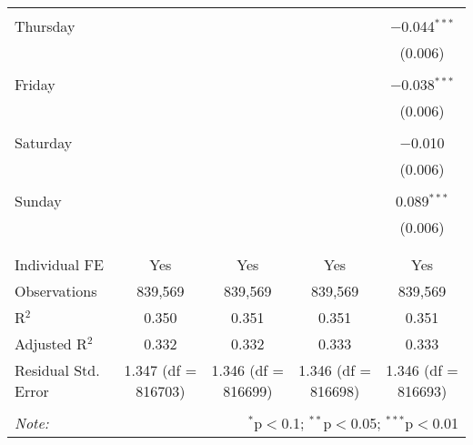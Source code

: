 \documentclass[
]{article}
\begin{document}
\begin{table}[!htbp]
{\begin{tabular}{@{\extracolsep{5pt}}lcccc}
  & & & & \\ 
 Thursday &  &  &  & $-$0.044$^{***}$ \\ 
  &  &  &  & (0.006) \\ 
  & & & & \\ 
 Friday &  &  &  & $-$0.038$^{***}$ \\ 
  &  &  &  & (0.006) \\ 
  & & & & \\ 
 Saturday &  &  &  & $-$0.010 \\ 
  &  &  &  & (0.006) \\ 
  & & & & \\ 
 Sunday &  &  &  & 0.089$^{***}$ \\ 
  &  &  &  & (0.006) \\ 
  & & & & \\ 
\hline \\[-1.8ex] 
Individual FE & Yes & Yes & Yes & Yes \\ 
Observations & 839,569 & 839,569 & 839,569 & 839,569 \\ 
R$^{2}$ & 0.350 & 0.351 & 0.351 & 0.351 \\ 
Adjusted R$^{2}$ & 0.332 & 0.332 & 0.333 & 0.333 \\ 
Residual Std. Error & 1.347 (df = 816703) & 1.346 (df = 816699) & 1.346 (df = 816698) & 1.346 (df = 816693) \\ 
\hline 
\hline \\[-1.8ex] 
\textit{Note:}  & \multicolumn{4}{r}{$^{*}$p$<$0.1; $^{**}$p$<$0.05; $^{***}$p$<$0.01} \\ 
\end{tabular}
} 
\end{table} 
\newpage
\end{document}
